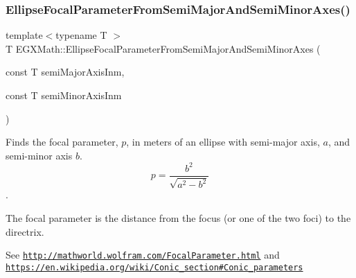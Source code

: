 \mbox{\label{group___e_g_x_math-_geometry-2_d-_ellipse-_focal_parameter_ga406c026954d4f5b357e0310461ed4d1d}} 
\subsubsection{\texorpdfstring{Ellipse\+Focal\+Parameter\+From\+Semi\+Major\+And\+Semi\+Minor\+Axes()}{EllipseFocalParameterFromSemiMajorAndSemiMinorAxes()}}
{\footnotesize\ttfamily template$<$typename T $>$ \\
T E\+G\+X\+Math\+::\+Ellipse\+Focal\+Parameter\+From\+Semi\+Major\+And\+Semi\+Minor\+Axes (\begin{DoxyParamCaption}\item[{const T}]{semi\+Major\+Axis\+Inm,  }\item[{const T}]{semi\+Minor\+Axis\+Inm }\end{DoxyParamCaption})}



Finds the focal parameter, $p$, in meters of an ellipse with semi-\/major axis, $a$, and semi-\/minor axis $b$. \[ p=\frac{b^2}{\sqrt{a^2-b^2}} \]. 

The focal parameter is the distance from the focus (or one of the two foci) to the directrix.

See \href{http://mathworld.wolfram.com/FocalParameter.html}{\tt http\+://mathworld.\+wolfram.\+com/\+Focal\+Parameter.\+html} and \href{https://en.wikipedia.org/wiki/Conic_section#Conic_parameters}{\tt https\+://en.\+wikipedia.\+org/wiki/\+Conic\+\_\+section\#\+Conic\+\_\+parameters}



